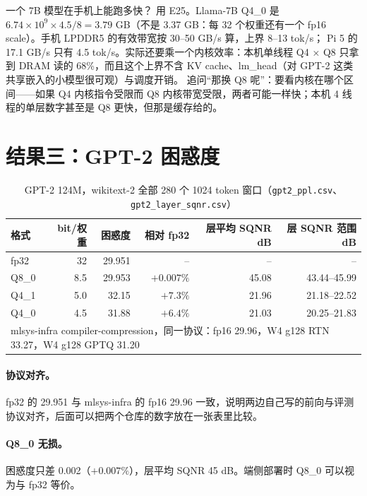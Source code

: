 \documentclass[11pt,a4paper]{ctexart}
\begin{document}
\begin{iqbox}{一个 7B 模型在手机上能跑多快？}
用 E25。Llama-7B Q4\_0 是 $6.74\times10^9 \times 4.5/8 = 3.79$ GB（不是 3.37 GB：每 32 个权重还有一个 fp16 scale）。手机 LPDDR5 的有效带宽按 30--50 GB/s 算，上界 8--13 tok/s；
Pi 5 的 17.1 GB/s 只有 4.5 tok/s。实际还要乘一个内核效率：本机单线程 Q4 × Q8 只拿到 DRAM 读的 68\%，而且这个上界不含 KV cache、lm\_head（对 GPT-2 这类共享嵌入的小模型很可观）与调度开销。
追问“那换 Q8 呢”：要看内核在哪个区间——如果 Q4 内核指令受限而 Q8 内核带宽受限，两者可能一样快；本机 4 线程的单层数字甚至是 Q8 更快，但那是缓存给的。
\end{iqbox}

\section{结果三：GPT-2 困惑度}\label{sec:res-ppl}

\begin{table}[H]
\centering\small
\caption{GPT-2 124M，wikitext-2 全部 280 个 1024 token 窗口（\texttt{gpt2\_ppl.csv}、\texttt{gpt2\_layer\_sqnr.csv}）}\label{tab:ppl}
\begin{tabular}{lrrrrr}
\toprule
格式 & bit/权重 & 困惑度 & 相对 fp32 & 层平均 SQNR dB & 层 SQNR 范围 dB \\
\midrule
fp32 & 32 & 29.951 & -- & -- & -- \\
Q8\_0 & 8.5 & 29.953 & $+0.007\%$ & 45.08 & 43.44--45.99 \\
Q4\_1 & 5.0 & 32.15 & $+7.3\%$ & 21.96 & 21.18--22.52 \\
Q4\_0 & 4.5 & 31.88 & $+6.4\%$ & 21.03 & 20.25--21.83 \\
\midrule
\multicolumn{6}{l}{\footnotesize mlsys-infra compiler-compression，同一协议：fp16 29.96，W4 g128 RTN 33.27，W4 g128 GPTQ 31.20} \\
\bottomrule
\end{tabular}
\end{table}

\paragraph{协议对齐。}fp32 的 29.951 与 mlsys-infra 的 fp16 29.96 一致，说明两边自己写的前向与评测协议对齐，后面可以把两个仓库的数字放在一张表里比较。

\paragraph{Q8\_0 无损。}困惑度只差 0.002（$+0.007\%$），层平均 SQNR 45 dB。端侧部署时 Q8\_0 可以视为与 fp32 等价。
\end{document}
